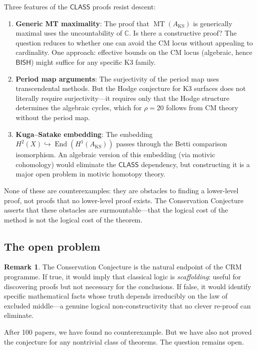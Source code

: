 \documentclass[11pt,a4paper]{article}
\theoremstyle{plain}
\theoremstyle{definition}
\newtheorem{remark}[theorem]{Remark}
\newcommand{\BISH}{\textsf{BISH}}
\newcommand{\CLASS}{\textsf{CLASS}}
\newcommand{\C}{\mathbb{C}}
\DeclareMathOperator{\End}{End}
\DeclareMathOperator{\MT}{MT}
\begin{document}
Three features of the $\CLASS$ proofs resist descent:

\begin{enumerate}[label=(\roman*)]
  \item \textbf{Generic MT maximality}: The proof that $\MT(A_{\mathrm{KS}})$ is generically maximal uses the uncountability of $\C$. Is there a constructive proof? The question reduces to whether one can avoid the CM locus without appealing to cardinality. One approach: effective bounds on the CM locus (algebraic, hence $\BISH$) might suffice for any specific K3 family.

  \item \textbf{Period map arguments}: The surjectivity of the period map uses transcendental methods. But the Hodge conjecture for K3 surfaces does not literally require surjectivity---it requires only that the Hodge structure determines the algebraic cycles, which for $\rho = 20$ follows from CM theory without the period map.

  \item \textbf{Kuga--Satake embedding}: The embedding $H^2(X) \hookrightarrow \End(H^1(A_{\mathrm{KS}}))$ passes through the Betti comparison isomorphism. An algebraic version of this embedding (via motivic cohomology) would eliminate the $\CLASS$ dependency, but constructing it is a major open problem in motivic homotopy theory.
\end{enumerate}

None of these are counterexamples: they are obstacles to finding a lower-level proof, not proofs that no lower-level proof exists. The Conservation Conjecture asserts that these obstacles are surmountable---that the logical cost of the method is not the logical cost of the theorem.

\subsection{The open problem}

\begin{remark}
The Conservation Conjecture is the natural endpoint of the CRM programme. If true, it would imply that classical logic is \emph{scaffolding}: useful for discovering proofs but not necessary for the conclusions. If false, it would identify specific mathematical facts whose truth depends irreducibly on the law of excluded middle---a genuine logical non-constructivity that no clever re-proof can eliminate.

After 100 papers, we have found no counterexample. But we have also not proved the conjecture for any nontrivial class of theorems. The question remains open.
\end{remark}
\end{document}
